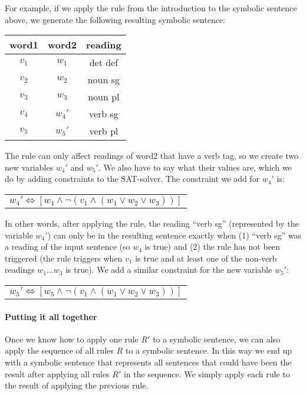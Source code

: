 For example, if we apply the rule from the introduction to the symbolic sentence above, we generate the following resulting symbolic sentence:
\begin{center}
\begin{tabular}{c|c|c}
word1 & word2 & reading \\
\hline
$v_1$ & $w_1$ & det def \\
$v_2$ & $w_2$ & noun sg \\
$v_3$ & $w_3$ & noun pl \\
$v_4$ & $w_4'$ & verb sg \\
$v_5$ & $w_5'$ & verb pl \\
\end{tabular}
\end{center}
The rule can only affect readings of word2 that have a verb tag, so we create two new variables $w_4'$ and $w_5'$. We also have to say what their values are, which we do by adding constraints to the SAT-solver. The constraint we add for $w_4'$ is:
\begin{center}
\begin{tabular}{c}
$w_4' \Leftrightarrow [ w_4 \wedge \neg{}(v_1 \wedge (w_1 \vee w_2 \vee w_3)) ]$ \\
\end{tabular}
\end{center}
In other words, after applying the rule, the reading ``verb sg'' (represented by the variable $w_4'$) can only be in the resulting sentence exactly when (1) ``verb sg'' was a reading of the input sentence (so $w_4$ is true) and (2) the rule has not been triggered (the rule triggers when $v_1$ is true and at least one of the non-verb readings $w_1 \dots w_3$ is true). We add a similar constraint for the new variable $w_5'$:
\begin{center}
\begin{tabular}{c}
$w_5' \Leftrightarrow [ w_5 \wedge \neg{}(v_1 \wedge (w_1 \vee w_2 \vee w_3)) ]$ \\
\end{tabular}
\end{center}

\paragraph{Putting it all together}

Once we know how to apply one rule $R'$ to a symbolic sentence, we can also apply the sequence of all rules $R$ to a symbolic sentence. In this way we end up with a symbolic sentence that represents all sentences that could have been the result after applying all rules $R'$ in the sequence. We simply apply each rule to the result of applying the previous rule.

